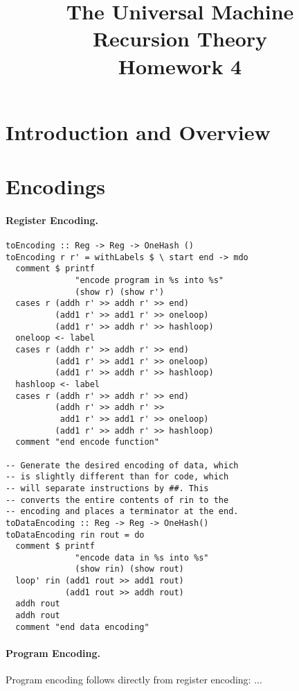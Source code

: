 \documentclass[10pt, preprint, nocopyrightspace]{sigplanconf}
\title{The Universal \oh Machine\\\large Recursion Theory\\ Homework 4}
\begin{document}
 

\maketitle

\section{Introduction and Overview}

\section{Encodings}

\paragraph{Register Encoding.}

\begin{lstlisting}
toEncoding :: Reg -> Reg -> OneHash ()
toEncoding r r' = withLabels $ \ start end -> mdo
  comment $ printf 
              "encode program in %s into %s" 
              (show r) (show r')
  cases r (addh r' >> addh r' >> end)
          (add1 r' >> add1 r' >> oneloop)
          (add1 r' >> addh r' >> hashloop)
  oneloop <- label
  cases r (addh r' >> addh r' >> end)
          (add1 r' >> add1 r' >> oneloop)
          (add1 r' >> addh r' >> hashloop)
  hashloop <- label
  cases r (addh r' >> addh r' >> end)
          (addh r' >> addh r' >> 
           add1 r' >> add1 r' >> oneloop)
          (add1 r' >> addh r' >> hashloop)
  comment "end encode function"

-- Generate the desired encoding of data, which 
-- is slightly different than for code, which
-- will separate instructions by ##. This 
-- converts the entire contents of rin to the 
-- encoding and places a terminator at the end.
toDataEncoding :: Reg -> Reg -> OneHash()
toDataEncoding rin rout = do
  comment $ printf 
              "encode data in %s into %s" 
              (show rin) (show rout)
  loop' rin (add1 rout >> add1 rout) 
            (add1 rout >> addh rout)
  addh rout
  addh rout
  comment "end data encoding"
\end{lstlisting}

\paragraph{Program Encoding.}

Program encoding follows directly from register encoding: ...
\end{document}
